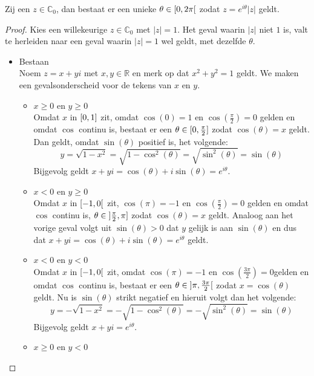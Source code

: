 \documentclass[main.tex]{subfiles}
\begin{document}
\begin{bpr}
  Zij een $z\in \mathbb{C}_{0}$, dan bestaat er een unieke $\theta \in \interval[open right]{0}{2\pi}$ zodat $z=e^{i\theta}|z|$ geldt.

  \begin{proof}
    Kies een willekeurige $z\in \mathbb{C}_{0}$ met $|z| = 1$.
    Het geval waarin $|z|$ niet $1$ is, valt te herleiden naar een geval waarin $|z|=1$ wel geldt, met dezelfde $\theta$. \waarom
    \begin{itemize}
    \item Bestaan\\
      Noem $z=x+yi$ met $x,y\in \mathbb{R}$ en merk op dat $x^{2}+y^{2}=1$ geldt.
      We maken een gevalsonderscheid voor de tekens van $x$ en $y$.
      \begin{itemize}
      \item $x\ge 0$ en $y\ge 0$\\
        Omdat $x$ in $\interval{0}{1}$ zit, omdat $\cos(0) = 1$ en $\cos\left(\frac{\pi}{2}\right) = 0$ gelden en omdat $\cos$ continu is, bestaat er een $\theta \in \interval{0}{\frac{\pi}{2}}$ zodat $\cos(\theta) = x$ geldt.
        Dan geldt, omdat $\sin(\theta)$ positief is\waarom, het volgende:
        \[ y = \sqrt{1-x^{2}} = \sqrt{1-\cos^{2}(\theta)} = \sqrt{\sin^{2}(\theta)} = \sin(\theta) \]
        Bijgevolg geldt $x+yi = \cos(\theta) + i \sin(\theta) = e^{i\theta}$.\needed
      \item $x<0$ en $y \ge 0$\\
        Omdat $x$ in $\interval[open right]{-1}{0}$ zit, $\cos(\pi) = -1$ en $\cos\left(\frac{\pi}{2}\right) = 0$ gelden en omdat $\cos$ continu is,  $\theta \in \interval[open left]{\frac{\pi}{2}}{\pi}$ zodat $\cos(\theta) = x$ geldt.
        Analoog aan het vorige geval volgt uit $\sin(\theta)>0$ dat $y$ gelijk is aan $\sin(\theta)$ en dus dat $x+yi = \cos(\theta) + i \sin(\theta) = e^{i\theta}$ geldt.
      \item $x<0$ en $y < 0$\\
        Omdat $x$ in $\interval[open right]{-1}{0}$ zit, omdat $\cos(\pi) = -1$ en $\cos\left(\frac{3\pi}{2}\right) = 0$\waarom gelden en omdat $\cos$ continu is, bestaat er een $\theta \in \interval[open]{\pi}{\frac{3\pi}{2}}$ zodat $x = \cos(\theta)$ geldt.
        Nu is $\sin(\theta)$ strikt negatief en hieruit volgt dan het volgende:
        \[ y = -\sqrt{1-x^{2}} = -\sqrt{1-\cos^{2}(\theta)} = -\sqrt{\sin^{2}(\theta)} = \sin(\theta) \]
        Bijgevolg geldt $x+yi= e^{i\theta}$.
      \item $x\ge 0$ en $y< 0$\\

\end{itemize}
\end{itemize}
\end{proof}
\end{bpr}
\end{document}
